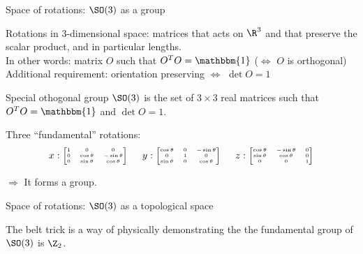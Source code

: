 \documentclass[10pt]{beamer}
\renewcommand{\emph}{\alert}
\begin{document}
\begin{frame}{Space of rotations: $\SO(3)$ as a group}
      
      Rotations in $3$-dimensional space: matrices that acts on $\R^3$ and that \emph{preserve the scalar product}, and in particular \emph{lengths}.\\[0.3cm]
      In other words: matrix $O$ such that $O^TO=\mathbbm{1}$ ($\Leftrightarrow$ $O$ is orthogonal)\\[0.3cm]
      Additional requirement: orientation preserving $\Leftrightarrow$ $\det O=1$\\[0.3cm]

      \begin{block}{Special othogonal group}
        $\SO(3)$ is the set of $3\times 3$ real matrices such that $O^TO=\mathbbm{1}$ and $\det O=1$.
      \end{block}
      Three ``fundamental'' rotations:
      \begin{equation*}
        {\tiny
        x:
        \begin{bmatrix}
          1 & 0 & 0 \\
          0 & \cos\theta & -\sin\theta \\
          0 & \sin\theta & \cos\theta
        \end{bmatrix}\qquad
        y:
        \begin{bmatrix}
          \cos\theta & 0 & -\sin\theta \\
          0 & 1 & 0 \\
          \sin\theta & 0 & \cos\theta
        \end{bmatrix}\qquad
        z:
        \begin{bmatrix}
          \cos\theta & -\sin\theta & 0 \\
          \sin\theta & \cos\theta & 0 \\
          0 & 0 & 1
        \end{bmatrix}}
      \end{equation*}

      $\Rightarrow$ It forms a \emph{group}.
    
\end{frame}

\begin{frame}{Space of rotations: $\SO(3)$ as a topological space}
  
\end{frame}



\begin{frame}
  The belt trick is a way of physically demonstrating the the fundamental group of $\SO(3)$ is $\Z_2$.
\end{frame}
\end{document}
